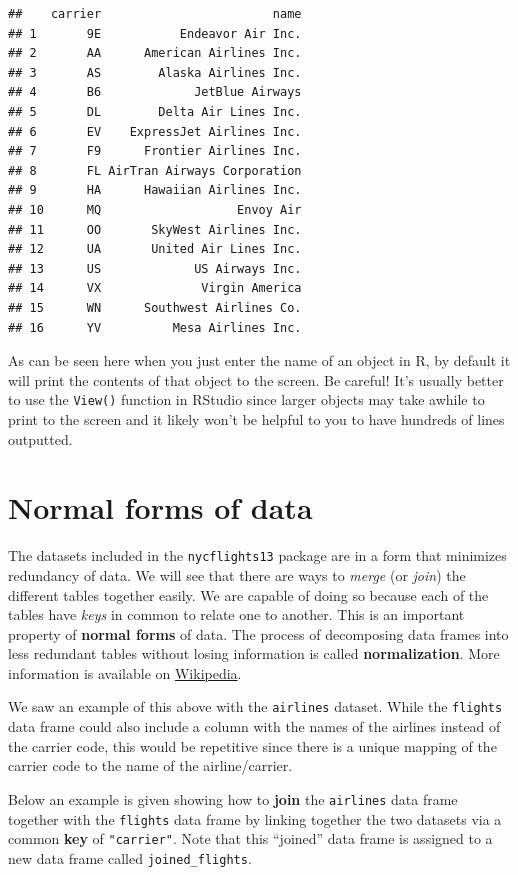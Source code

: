 \documentclass[]{tufte-book}
\begin{document}
\begin{verbatim}
##    carrier                        name
## 1       9E           Endeavor Air Inc.
## 2       AA      American Airlines Inc.
## 3       AS        Alaska Airlines Inc.
## 4       B6             JetBlue Airways
## 5       DL        Delta Air Lines Inc.
## 6       EV    ExpressJet Airlines Inc.
## 7       F9      Frontier Airlines Inc.
## 8       FL AirTran Airways Corporation
## 9       HA      Hawaiian Airlines Inc.
## 10      MQ                   Envoy Air
## 11      OO       SkyWest Airlines Inc.
## 12      UA       United Air Lines Inc.
## 13      US             US Airways Inc.
## 14      VX              Virgin America
## 15      WN      Southwest Airlines Co.
## 16      YV          Mesa Airlines Inc.
\end{verbatim}

As can be seen here when you just enter the name of an object in R, by
default it will print the contents of that object to the screen. Be
careful! It's usually better to use the \texttt{View()} function in
RStudio since larger objects may take awhile to print to the screen and
it likely won't be helpful to you to have hundreds of lines outputted.

\section{Normal forms of data}\label{normal-forms-of-data}

The datasets included in the \texttt{nycflights13} package are in a form
that minimizes redundancy of data. We will see that there are ways to
\emph{merge} (or \emph{join}) the different tables together easily. We
are capable of doing so because each of the tables have \emph{keys} in
common to relate one to another. This is an important property of
\textbf{normal forms} of data. The process of decomposing data frames
into less redundant tables without losing information is called
\textbf{normalization}. More information is available on
\href{https://en.wikipedia.org/wiki/Database_normalization}{Wikipedia}.

We saw an example of this above with the \texttt{airlines} dataset.
While the \texttt{flights} data frame could also include a column with
the names of the airlines instead of the carrier code, this would be
repetitive since there is a unique mapping of the carrier code to the
name of the airline/carrier.

Below an example is given showing how to \textbf{join} the
\texttt{airlines} data frame together with the \texttt{flights} data
frame by linking together the two datasets via a common \textbf{key} of
\texttt{"carrier"}. Note that this ``joined'' data frame is assigned to
a new data frame called \texttt{joined\_flights}.
\end{document}
